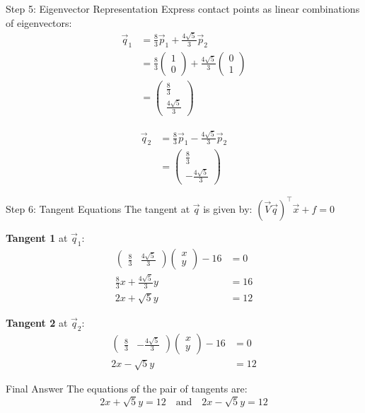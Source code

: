 \documentclass{beamer}
\newcommand{\myvec}[1]{\ensuremath{\begin{pmatrix}#1\end{pmatrix}}}
\begin{document}
	\begin{frame}{Step 5: Eigenvector Representation}
	Express contact points as linear combinations of eigenvectors:
		\begin{align}
			\vec{q}_1 &= \frac{8}{3}\vec{p}_1 + \frac{4\sqrt{5}}{3}\vec{p}_2\\
			&= \frac{8}{3}\myvec{1\\0} + \frac{4\sqrt{5}}{3}\myvec{0\\1}\\
			&= \myvec{\frac{8}{3}\\\frac{4\sqrt{5}}{3}}
		\end{align}
		
		\begin{align}
			\vec{q}_2 &= \frac{8}{3}\vec{p}_1 - \frac{4\sqrt{5}}{3}\vec{p}_2\\
			&= \myvec{\frac{8}{3}\\-\frac{4\sqrt{5}}{3}}
		\end{align}
	
	\end{frame}
	
	\begin{frame}{Step 6: Tangent Equations}
		The tangent at $\vec{q}$ is given by: $(\vec{V}\vec{q})^\top \vec{x} + f = 0$
		
		\vspace{1em}
		\textbf{Tangent 1} at $\vec{q}_1$:
		\begin{align}
			\myvec{\frac{8}{3} & \frac{4\sqrt{5}}{3}}\myvec{x\\y} - 16 &= 0\\
			\frac{8}{3}x + \frac{4\sqrt{5}}{3}y &= 16\\
			2x + \sqrt{5}y &= 12
		\end{align}
		
		\textbf{Tangent 2} at $\vec{q}_2$:
		\begin{align}
			\myvec{\frac{8}{3} & -\frac{4\sqrt{5}}{3}}\myvec{x\\y} - 16 &= 0\\
			2x - \sqrt{5}y &= 12
		\end{align}
	\end{frame}
	
	\begin{frame}{Final Answer}
		The equations of the pair of tangents are:
		\begin{equation}
			\boxed{2x + \sqrt{5}y = 12 \quad \text{and} \quad 2x - \sqrt{5}y = 12}
		\end{equation}
	\end{frame}
	
\end{document}
